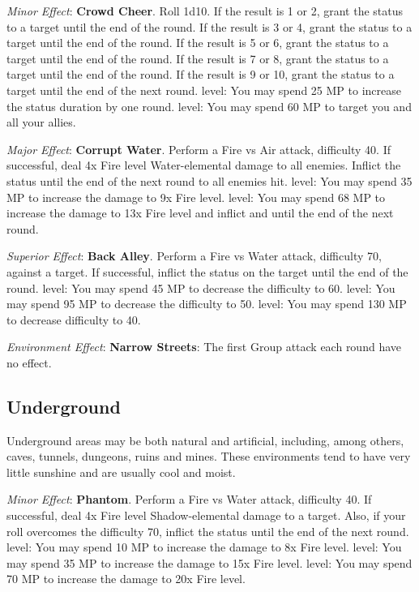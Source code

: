 \begin{multicols}{2}
\textit{Minor Effect}: \textbf{Crowd Cheer}. Roll 1d10. If the result is 1 or 2, grant the  status to a target until the end of the round. If the result is 3 or 4, grant the  status to a target until the end of the round. If the result is 5 or 6, grant the  status to a target until the end of the round. If the result is 7 or 8, grant the  status to a target until the end of the round. If the result is 9 or 10, grant the  status to a target until the end of the next round.  level: You may spend 25 MP to increase the status duration by one round.  level: You may spend 60 MP to target you and all your allies.

\textit{Major Effect}: \textbf{Corrupt Water}. Perform a Fire vs Air attack, difficulty 40. If successful, deal 4x Fire level Water-elemental damage to all enemies. Inflict the  status until the end of the next round to all enemies hit.  level: You may spend 35 MP to increase the damage to 9x Fire level.  level: You may spend 68 MP to increase the damage to 13x Fire level and inflict  and  until the end of the next round.

\textit{Superior Effect}: \textbf{Back Alley}. Perform a Fire vs Water attack, difficulty 70, against a target. If successful, inflict the  status on the target until the end of the round.  level: You may spend 45 MP to decrease the difficulty to 60.  level: You may spend 95 MP to decrease the difficulty to 50.  level: You may spend 130 MP to decrease difficulty to 40.

\textit{Environment Effect}: \textbf{Narrow Streets}: The first Group attack each round have no effect.

\subsection*{Underground}\label{subsec:geo-underground}
Underground areas may be both natural and artificial, including, among others, caves, tunnels, dungeons, ruins and mines. These environments tend to have very little sunshine and are usually cool and moist.

\textit{Minor Effect}: \textbf{Phantom}. Perform a Fire vs Water attack, difficulty 40. If successful, deal 4x Fire level Shadow-elemental damage to a target. Also, if your roll overcomes the difficulty 70, inflict the  status until the end of the next round.  level: You may spend 10 MP to increase the damage to 8x Fire level.  level: You may spend 35 MP to increase the damage to 15x Fire level.  level: You may spend 70 MP to increase the damage to 20x Fire level.


\end{multicols}

